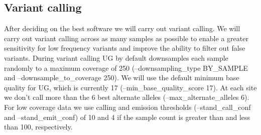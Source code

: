 \subsection{Variant calling}
After deciding on the best software we will carry out variant calling. We will carry out variant calling across as many samples as possible to enable a greater sensitivity for low frequency variants and improve the ability to filter out false variants.
During variant calling UG by default downsamples each sample randomly to a maximum coverage of 250 (--downsampling\_type BY\_SAMPLE and --downsample\_to\_coverage 250). We will use the default minimum base quality for UG, which is currently 17 (--min\_base\_quality\_score 17). %
At each site we don't call more than the 6 best alternate alleles (--max\_alternate\_alleles 6).
For low coverage data we use calling and emission thresholds (--stand\_call\_conf and --stand\_emit\_conf) of 10 and 4 if the sample count is greater than and less than 100, respectively.


%

